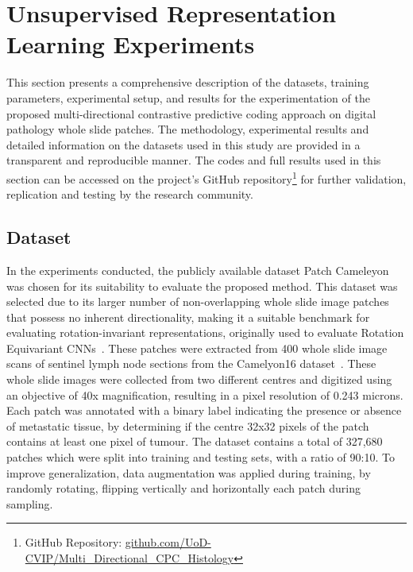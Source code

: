 \section{Unsupervised Representation Learning Experiments}
\label{sec:unsupervised_experiments}
This section presents a comprehensive description of the datasets, training parameters, experimental setup, and results for the experimentation of the proposed multi-directional contrastive predictive coding approach on digital pathology whole slide patches. The methodology, experimental results and detailed information on the datasets used in this study are provided in a transparent and reproducible manner. The codes and full results used in this section can be accessed on the project's GitHub repository\footnote{GitHub Repository: \url{github.com/UoD-CVIP/Multi_Directional_CPC_Histology}} for further validation, replication and testing by the research community.

\subsection{Dataset}
\label{subsec:unsupervised_dataset}
In the experiments conducted, the publicly available dataset Patch Cameleyon~\citep{veeling2018rotation} was chosen for its suitability to evaluate the proposed method. This dataset was selected due to its larger number of non-overlapping whole slide image patches that possess no inherent directionality, making it a suitable benchmark for evaluating rotation-invariant representations, originally used to evaluate Rotation Equivariant CNNs~\citep{veeling2018rotation}. These patches were extracted from 400 whole slide image scans of sentinel lymph node sections from the Camelyon16 dataset~\citep{litjens20181399}. These whole slide images were collected from two different centres and digitized using an objective of 40x magnification, resulting in a pixel resolution of 0.243 microns. Each patch was annotated with a binary label indicating the presence or absence of metastatic tissue, by determining if the centre 32x32 pixels of the patch contains at least one pixel of tumour. The dataset contains a total of 327,680 patches which were split into training and testing sets, with a ratio of 90:10. To improve generalization, data augmentation was applied during training, by randomly rotating, flipping vertically and horizontally each patch during sampling.

